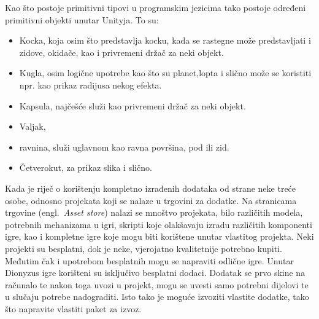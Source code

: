 Kao što postoje primitivni tipovi u programskim jezicima tako postoje određeni primitivni objekti unutar Unityja. To su:
\begin{itemize}
 \item Kocka, koja osim što predstavlja kocku, kada se rastegne može predstavljati i zidove, okidače, kao i privremeni držač za neki objekt.
 \item Kugla, osim logične upotrebe kao što su planet,lopta i slično može se koristiti npr. kao prikaz radijusa nekog efekta.
 \item Kapsula, najčešće služi kao privremeni držač za neki objekt.
 \item Valjak,
 \item ravnina, služi uglavnom kao ravna površina, pod ili zid.
 \item Četverokut, za prikaz slika i slično.
\end{itemize}

Kada je riječ o korištenju kompletno izrađenih dodataka od strane neke treće osobe, odnosno projekata koji se nalaze u trgovini za dodatke. Na stranicama trgovine (engl.~\textit{Asset store}) nalazi se mnoštvo projekata, bilo različitih modela, potrebnih mehanizama u igri, skripti koje olakšavaju izradu različitih komponenti igre, kao i kompletne igre koje mogu biti korištene unutar vlastitog projekta. Neki projekti su besplatni, dok je neke, vjerojatno kvalitetnije potrebno kupiti. Međutim čak i upotrebom besplatnih mogu se napraviti odlične igre. Unutar Dionyzus igre korišteni su isključivo besplatni dodaci.
Dodatak se prvo skine na računalo te nakon toga uvozi u projekt, mogu se uvesti samo potrebni dijelovi te u slučaju potrebe nadograditi. Isto tako je moguće izvoziti vlastite dodatke, tako što napravite vlastiti paket za izvoz.

